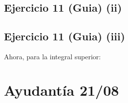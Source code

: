 \documentclass[a4paper]{report}
\begin{document}
\subsection{Ejercicio 11 (Guia) (ii)}  


\subsection{Ejercicio 11 (Guia) (iii)}  





	Ahora, para la integral superior:


\section{Ayudantía 21/08}
\end{document}

